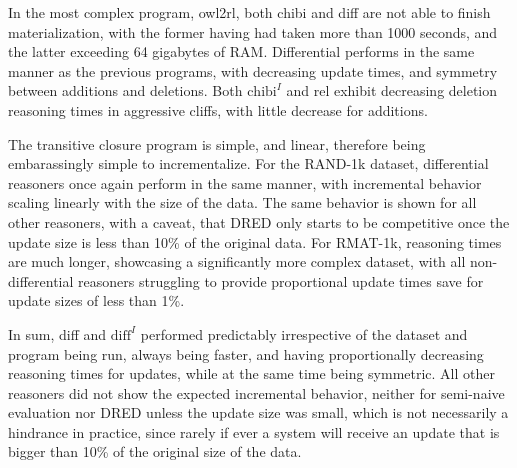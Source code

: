 \documentclass[sigconf,screen,review=false,natbib]{acmart}
\theoremstyle{definition}
\begin{document}
In the most complex program, owl2rl, both chibi and diff are not able to finish materialization, with the former having had taken more than 1000 seconds, and the latter
exceeding 64 gigabytes of RAM. Differential performs in the same manner as the previous programs, with decreasing update times, and symmetry between additions and
deletions. Both $\text{chibi}^{I}$ and rel exhibit decreasing deletion reasoning times in aggressive cliffs, with little decrease for additions.

The transitive closure program is simple, and linear, therefore being embarassingly simple to incrementalize. For the RAND-1k dataset, differential reasoners once again
perform in the same manner, with incremental behavior scaling linearly with the size of the data. The same behavior is shown for all other reasoners, with a caveat, that
DRED only starts to be competitive once the update size is less than 10\% of the original data. For RMAT-1k, reasoning times are much longer, showcasing a significantly
more complex dataset, with all non-differential reasoners struggling to provide proportional update times save for update sizes of less than 1\%.

In sum, diff and $\text{diff}^{I}$ performed predictably irrespective of the dataset and program being run, always being faster, and having proportionally decreasing reasoning
times for updates, while at the same time being symmetric. All other reasoners did not show the expected incremental behavior, neither for semi-naive evaluation nor DRED unless
the update size was small, which is not necessarily a hindrance in practice, since rarely if ever a system will receive an update that is bigger than 10\% of the original size
of the data.
\end{document}
